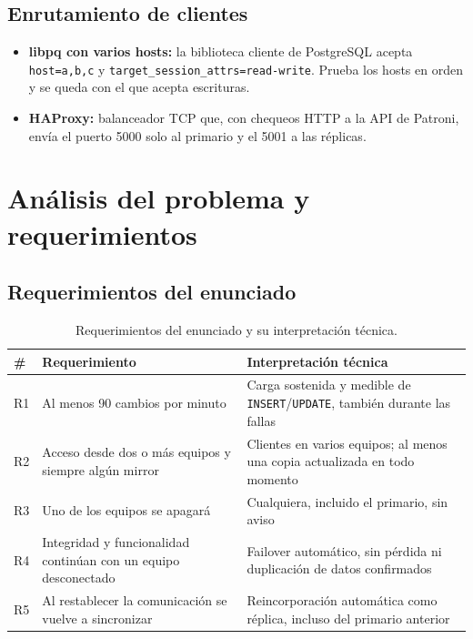 \documentclass[11pt,a4paper]{article}
\newcommand{\cod}[1]{\texttt{#1}}
\begin{document}
\subsection{Enrutamiento de clientes}

\begin{itemize}
  \item \textbf{libpq con varios hosts:} la biblioteca cliente de PostgreSQL acepta \cod{host=a,b,c} y \cod{target\_session\_attrs=read-write}. Prueba los hosts en orden y se queda con el que acepta escrituras.
  \item \textbf{HAProxy:} balanceador TCP que, con chequeos HTTP a la API de Patroni, envía el puerto 5000 solo al primario y el 5001 a las réplicas.
\end{itemize}

\section{Análisis del problema y requerimientos}

\subsection{Requerimientos del enunciado}

\begin{table}[H]
\centering
\caption{Requerimientos del enunciado y su interpretación técnica.}
\begin{tabularx}{\textwidth}{@{}lL{5.2cm}Y@{}}
\toprule
\textbf{\#} & \textbf{Requerimiento} & \textbf{Interpretación técnica} \\
\midrule
R1 & Al menos 90 cambios por minuto & Carga sostenida y medible de \cod{INSERT}/\cod{UPDATE}, también durante las fallas \\
R2 & Acceso desde dos o más equipos y siempre algún mirror & Clientes en varios equipos; al menos una copia actualizada en todo momento \\
R3 & Uno de los equipos se apagará & Cualquiera, incluido el primario, sin aviso \\
R4 & Integridad y funcionalidad continúan con un equipo desconectado & Failover automático, sin pérdida ni duplicación de datos confirmados \\
R5 & Al restablecer la comunicación se vuelve a sincronizar & Reincorporación automática como réplica, incluso del primario anterior \\
\bottomrule
\end{tabularx}
\end{table}
\end{document}
